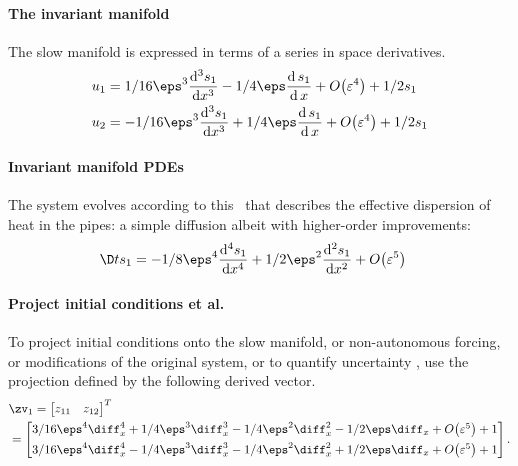 \paragraph{The invariant manifold} 
The slow manifold is expressed in terms of a series in space derivatives.
\begin{align*}&
u_{1}={ 1/16 \eps^{3} \frac{{\rm d}^{3}s_{1}}{{\rm d}x^{3}}-1/4 \eps 
\frac{{\rm d}\,s_{1}}{{\rm d}\,x}+O\big(\varepsilon ^{4}\big)+1/2 s_{1}
}\\&
u_{2}={ -1/16 \eps^{3} \frac{{\rm d}^{3}s_{1}}{{\rm d}x^{3}}+1/4 \eps 
\frac{{\rm d}\,s_{1}}{{\rm d}\,x}+O\big(\varepsilon ^{4}\big)+1/2 s_{1}
}\end{align*}

 
\paragraph{Invariant manifold PDEs} 
The system evolves according to this \pde\ that describes the effective dispersion of heat in the pipes: a simple diffusion albeit with higher-order improvements:
\begin{align*}&
\D t{s_{1}}={ -1/8 \eps^{4} \frac{{\rm d}^{4}s_{1}}{{\rm d}x^{4}}+1/2 \eps
^{2} \frac{{\rm d}^{2}s_{1}}{{\rm d}x^{2}}+O\big(\varepsilon ^{5}\big)
}\end{align*}



\paragraph{Project initial conditions et al.}
To project initial conditions
onto the slow manifold, or non-autonomous
forcing, or modifications of the original system, or to quantify uncertainty \cite[Ch.12]{Roberts89b, Roberts97b, Roberts2014a}, use the projection defined by the following derived vector.
\begin{align*}&
\zv_1=\begin{bmatrix}z_{11}&z_{12}\end{bmatrix}^T
\\&
=\begin{bmatrix}
{ 3/16 \eps^{4} \diff_{x}^{4}+1/4 \eps^{3} \diff_{x}^{3}-1/4 \eps^{
2} \diff_{x}^{2}-1/2 \eps \diff_{x}+O\big(\varepsilon ^{5}\big)+1
}\\[1ex]
{ 3/16 \eps^{4} \diff_{x}^{4}-1/4 \eps^{3} \diff_{x}^{3}-1/4 \eps^{
2} \diff_{x}^{2}+1/2 \eps \diff_{x}+O\big(\varepsilon ^{5}\big)+1
}
\end{bmatrix}.
\end{align*}

